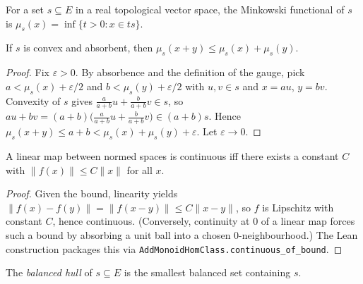 \begin{definition}
  \label{def:minkowski}
  \leanok
  For a set $s \subseteq E$ in a real topological vector space, the
  Minkowski functional of $s$ is
  $\mu_s(x) = \inf\{ t > 0 : x \in t s \}$.
\end{definition}

\begin{theorem}
  \label{thm:minkowski-subadditive}
  \leanok
  If $s$ is convex and absorbent, then $\mu_s(x + y) \le \mu_s(x) + \mu_s(y)$.
\end{theorem}
\begin{proof}
  \leanok
  Fix $\varepsilon > 0$. By absorbence and the definition of the gauge,
  pick $a < \mu_s(x) + \varepsilon/2$ and $b < \mu_s(y) + \varepsilon/2$
  with $u, v \in s$ and $x = a u$, $y = b v$. Convexity of $s$ gives
  $\tfrac{a}{a+b} u + \tfrac{b}{a+b} v \in s$, so
  $a u + b v = (a + b)\bigl(\tfrac{a}{a+b} u + \tfrac{b}{a+b} v\bigr) \in
  (a + b) s$. Hence $\mu_s(x + y) \le a + b < \mu_s(x) + \mu_s(y) +
  \varepsilon$. Let $\varepsilon \to 0$.
\end{proof}

\begin{theorem}
  \label{thm:linear-continuity-bound}
  \leanok
  A linear map between normed spaces is continuous iff there exists a
  constant $C$ with $\|f(x)\| \le C\|x\|$ for all $x$.
\end{theorem}
\begin{proof}
  \leanok
  Given the bound, linearity yields $\|f(x) - f(y)\| = \|f(x - y)\| \le
  C\|x - y\|$, so $f$ is Lipschitz with constant $C$, hence continuous.
  (Conversely, continuity at $0$ of a linear map forces such a bound by
  absorbing a unit ball into a chosen $0$-neighbourhood.) The Lean
  construction packages this via
  \texttt{AddMonoidHomClass.continuous\_of\_bound}.
\end{proof}

\begin{definition}
  \label{def:balanced-hull}
  \leanok
  The \emph{balanced hull} of $s \subseteq E$ is the smallest balanced
  set containing $s$.
\end{definition}

